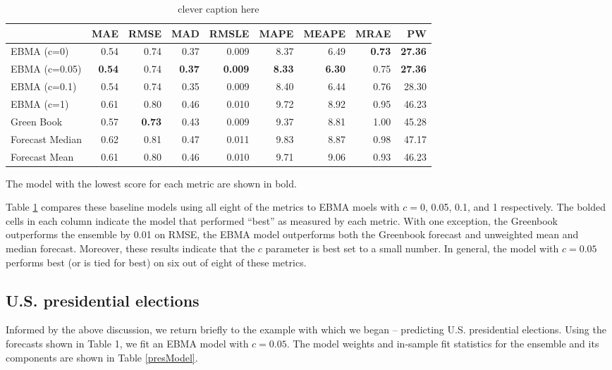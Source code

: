 \documentclass[12pt,fullpage,endnotes]{article}
\begin{document}
\begin{table}[h]
\caption{clever caption here}
\begin{center}
\begin{tabular}{lrrrrrrrr}
\toprule
 & MAE & RMSE & MAD & RMSLE & MAPE & MEAPE & MRAE & PW \\ 
\midrule
 EBMA (c=0)& 0.54 & 0.74 & 0.37 & 0.009 & 8.37 & 6.49 & \textbf{0.73} & \textbf{27.36} \\ 
  EBMA (c=0.05)& \textbf{0.54} & 0.74 &\textbf{ 0.37} & \textbf{0.009} & \textbf{8.33} & \textbf{6.30} & 0.75 & \textbf{27.36} \\ 
 EBMA (c=0.1)& 0.54 & 0.74 & 0.35 & 0.009 & 8.40 & 6.44 & 0.76 & 28.30 \\ 
EBMA (c=1) & 0.61 & 0.80 & 0.46 & 0.010 & 9.72 & 8.92 & 0.95 & 46.23 \\ 
 Green Book& 0.57 & \textbf{0.73} & 0.43 & 0.009 & 9.37 & 8.81 & 1.00 & 45.28 \\ 
 Forecast Median& 0.62 & 0.81 & 0.47 & 0.011 & 9.83 & 8.87 & 0.98 & 47.17 \\ 
Forecast Mean& 0.61 & 0.80 & 0.46 & 0.010 & 9.71 & 9.06 & 0.93 & 46.23 \\ 
\bottomrule
\end{tabular}
\end{center}

\label{compareTable1}
The model with the lowest score for each metric are shown in bold.  
\end{table}


Table \ref{compareTable1} compares these baseline models using all
eight of the metrics to EBMA moels with $c=$0, 0.05, 0.1, and 1
respectively.  The bolded cells in each column indicate the model that
performed ``best'' as measured by each metric.  With one exception,
the Greenbook outperforms the ensemble by 0.01 on RMSE, the EBMA model
outperforms both the Greenbook forecast and unweighted mean and
median forecast.  Moreover, these results indicate that the $c$
parameter is best set to a small number.  In general, the model with
$c=0.05$ performs best (or is tied for best) on six out of eight of
these metrics.


\subsection{U.S. presidential elections}

Informed by the above discussion, we return briefly to the example
with which we began -- predicting U.S. presidential elections.  Using
the forecasts shown in Table 1, we fit an EBMA model with $c=0.05$.
The model weights and in-sample fit statistics for the ensemble and
its components are shown in Table \ref{presModel}.
\end{document}
